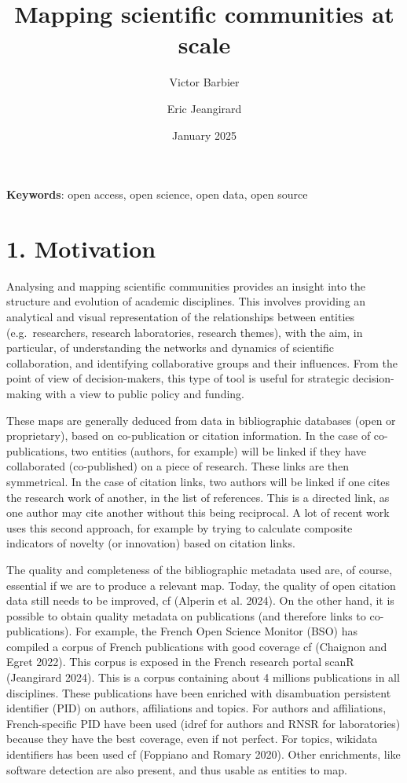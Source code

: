 \documentclass[
]{article}
\title{Mapping scientific communities at scale}
\author[%
  1%
  ]{%
  Victor Barbier%
}
\author[%
  1%
  ]{%
  Eric Jeangirard%
}
\affil[1]{French Ministry of Higher Education and Research, Paris,
France}
\date{January 2025}
\begin{document}
\maketitle

\textbf{Keywords}: open access, open science, open data, open source

\hypertarget{motivation}{%
\section{1. Motivation}\label{motivation}}

Analysing and mapping scientific communities provides an insight into
the structure and evolution of academic disciplines. This involves
providing an analytical and visual representation of the relationships
between entities (e.g.~researchers, research laboratories, research
themes), with the aim, in particular, of understanding the networks and
dynamics of scientific collaboration, and identifying collaborative
groups and their influences. From the point of view of decision-makers,
this type of tool is useful for strategic decision-making with a view to
public policy and funding.

These maps are generally deduced from data in bibliographic databases
(open or proprietary), based on co-publication or citation information.
In the case of co-publications, two entities (authors, for example) will
be linked if they have collaborated (co-published) on a piece of
research. These links are then symmetrical. In the case of citation
links, two authors will be linked if one cites the research work of
another, in the list of references. This is a directed link, as one
author may cite another without this being reciprocal. A lot of recent
work uses this second approach, for example by trying to calculate
composite indicators of novelty (or innovation) based on citation links.

The quality and completeness of the bibliographic metadata used are, of
course, essential if we are to produce a relevant map. Today, the
quality of open citation data still needs to be improved, cf (Alperin et
al. 2024). On the other hand, it is possible to obtain quality metadata
on publications (and therefore links to co-publications). For example,
the French Open Science Monitor (BSO) has compiled a corpus of French
publications with good coverage cf (Chaignon and Egret 2022). This
corpus is exposed in the French research portal scanR (Jeangirard 2024).
This is a corpus containing about 4 millions publications in all
disciplines. These publications have been enriched with disambuation
persistent identifier (PID) on authors, affiliations and topics. For
authors and affiliations, French-specific PID have been used (idref for
authors and RNSR for laboratories) because they have the best coverage,
even if not perfect. For topics, wikidata identifiers has been used cf
(Foppiano and Romary 2020). Other enrichments, like software detection
are also present, and thus usable as entities to map.
\end{document}
